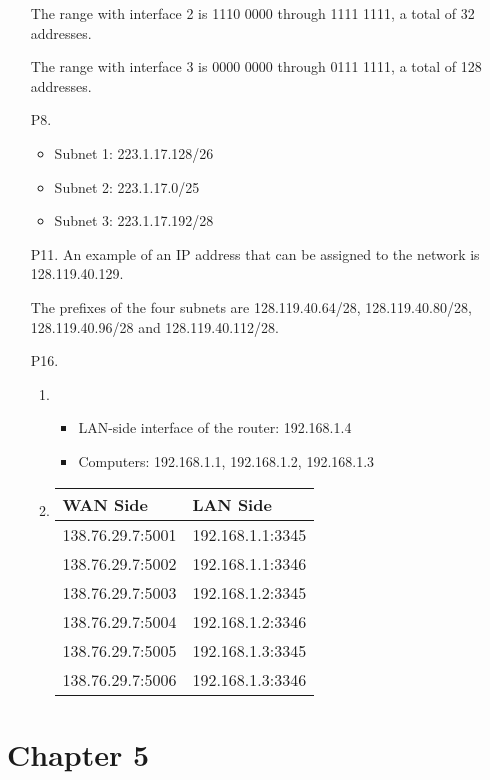 \documentclass{article}
\begin{document}
\begin{enumerate}
    The range with interface 2 is 1110 0000 through 1111 1111, a total of 32 addresses.

    The range with interface 3 is 0000 0000 through 0111 1111, a total of 128 addresses.

    \item[P8.] \begin{itemize}
        \item Subnet 1: 223.1.17.128/26
        \item Subnet 2: 223.1.17.0/25
        \item Subnet 3: 223.1.17.192/28
    \end{itemize}

    \item[P11.] An example of an IP address that can be assigned to the network is 128.119.40.129.
    
    The prefixes of the four subnets are 128.119.40.64/28, 128.119.40.80/28, 128.119.40.96/28 and 128.119.40.112/28.
 
    \item[P16.] \begin{enumerate}
        \item \begin{itemize}
            \item LAN-side interface of the router: 192.168.1.4
            \item Computers: 192.168.1.1, 192.168.1.2, 192.168.1.3
        \end{itemize}
        \item \begin{tabular}{@{}ll@{}}
            \toprule
            WAN Side & LAN Side \\ \midrule
            138.76.29.7:5001 & 192.168.1.1:3345 \\
            138.76.29.7:5002 & 192.168.1.1:3346 \\
            138.76.29.7:5003 & 192.168.1.2:3345 \\
            138.76.29.7:5004 & 192.168.1.2:3346 \\
            138.76.29.7:5005 & 192.168.1.3:3345 \\
            138.76.29.7:5006 & 192.168.1.3:3346 \\ \bottomrule
        \end{tabular}            
    \end{enumerate}
\end{enumerate}

\section*{Chapter 5}
\end{document}
